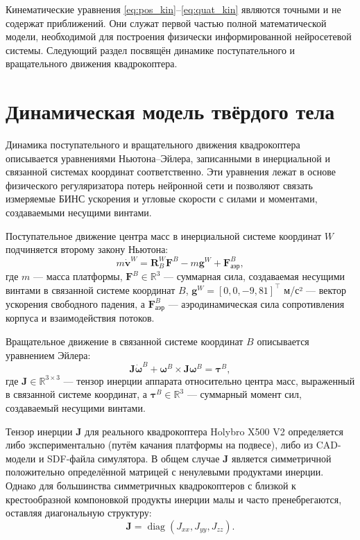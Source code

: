 Кинематические уравнения \eqref{eq:pos_kin}--\eqref{eq:quat_kin} являются точными и не содержат приближений. Они служат первой частью полной математической модели, необходимой для построения физически информированной нейросетевой системы. Следующий раздел посвящён динамике поступательного и вращательного движения квадрокоптера.

\section{Динамическая модель твёрдого тела}
\label{sec:dynamics_rigid}

Динамика поступательного и вращательного движения квадрокоптера описывается уравнениями Ньютона–Эйлера, записанными в инерциальной и связанной системах координат соответственно. Эти уравнения лежат в основе физического регуляризатора потерь нейронной сети и позволяют связать измеряемые БИНС ускорения и угловые скорости с силами и моментами, создаваемыми несущими винтами.

Поступательное движение центра масс в инерциальной системе координат \(W\) подчиняется второму закону Ньютона:
\begin{equation}
	m \dot{\mathbf{v}}^W = \mathbf{R}^W_B \mathbf{F}^B - m \mathbf{g}^W + \mathbf{F}_\text{аэр}^B,
	\label{eq:trans_dyn}
\end{equation}
где \(m\) — масса платформы, \(\mathbf{F}^B \in \mathbb{R}^3\) — суммарная сила, создаваемая несущими винтами в связанной системе координат \(B\), \(\mathbf{g}^W = [0, 0, -9{,}81]^\top\) м/с² — вектор ускорения свободного падения, а \(\mathbf{F}_\text{аэр}^B\) — аэродинамическая сила сопротивления корпуса и взаимодействия потоков.

Вращательное движение в связанной системе координат \(B\) описывается уравнением Эйлера:
\begin{equation}
	\mathbf{J} \dot{\boldsymbol{\omega}}^B + \boldsymbol{\omega}^B \times \mathbf{J} \boldsymbol{\omega}^B = \boldsymbol{\tau}^B,
	\label{eq:rot_dyn}
\end{equation}
где \(\mathbf{J} \in \mathbb{R}^{3\times 3}\) — тензор инерции аппарата относительно центра масс, выраженный в связанной системе координат, а \(\boldsymbol{\tau}^B \in \mathbb{R}^3\) — суммарный момент сил, создаваемый несущими винтами.

Тензор инерции \(\mathbf{J}\) для реального квадрокоптера Holybro X500 V2 определяется либо экспериментально (путём качания платформы на подвесе), либо из CAD-модели и SDF-файла симулятора. В общем случае \(\mathbf{J}\) является симметричной положительно определённой матрицей с ненулевыми продуктами инерции. Однако для большинства симметричных квадрокоптеров с близкой к крестообразной компоновкой продукты инерции малы и часто пренебрегаются, оставляя диагональную структуру:
\[
\mathbf{J} = \operatorname{diag}(J_{xx}, J_{yy}, J_{zz}).
\]

